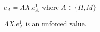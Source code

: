 \begin{case}

$e_{A}=\Lambda X.e_{A}^{1}$ where $A\in\lbrace H,M\rbrace$

$\Lambda X.e_{A}^{1}$ is an unforced value.

\end{case}